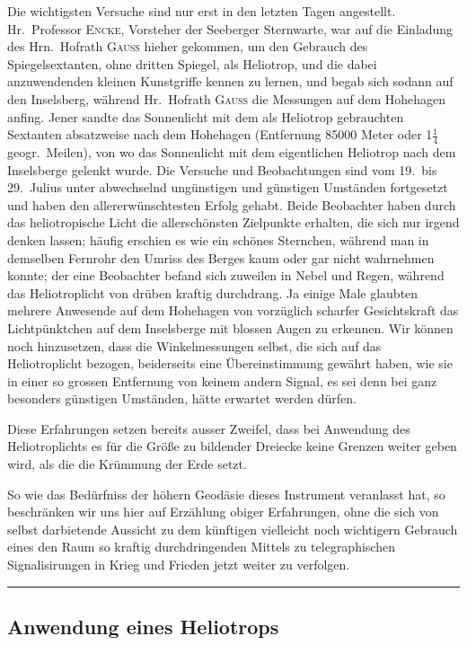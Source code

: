 \documentclass[12pt,a4paper]{article}
\theoremstyle{plain}
\theoremstyle{definition}
\theoremstyle{remark}
\begin{document}
Die wichtigsten Versuche sind nur erst in den letzten Tagen angestellt. Hr.\ Professor \textsc{Encke}, Vorsteher der Seeberger Sternwarte, war auf die Einladung des Hrn.\ Hofrath \textsc{Gau\ss{}} hieher gekommen, um den Gebrauch des Spiegelsextanten, ohne dritten Spiegel, als Heliotrop, und die dabei anzuwendenden kleinen Kunstgriffe kennen zu lernen, und begab sich sodann auf den Inselsberg, w\"ahrend Hr.\ Hofrath \textsc{Gau\ss{}} die Messungen auf dem Hohehagen anfing. Jener sandte das Sonnenlicht mit dem als Heliotrop gebrauchten Sextanten absatzweise nach dem Hohehagen (Entfernung 85000 Meter oder 1$\tfrac14$ geogr.\ Meilen), von wo das Sonnenlicht mit dem eigentlichen Heliotrop nach dem Inselsberge gelenkt wurde. Die Versuche und Beobachtungen sind vom 19.\ bis 29.\ Julius unter abwechselnd ung\"unstigen und g\"unstigen Umst\"anden fortgesetzt und haben den allererw\"unschtesten Erfolg gehabt. Beide Beobachter haben durch das heliotropische Licht die allersch\"onsten Zielpunkte erhalten, die sich nur irgend denken lassen; h\"aufig erschien es wie ein sch\"ones Sternchen, w\"ahrend man in demselben Fernrohr den Umriss des Berges kaum oder gar nicht wahrnehmen konnte; der eine Beobachter befand sich zuweilen in Nebel und Regen, w\"ahrend das Heliotroplicht von dr\"uben kraftig durchdrang. Ja einige Male glaubten mehrere Anwesende auf dem Hohehagen von vorz\"uglich scharfer Gesichtskraft das Lichtp\"unktchen auf dem Inselsberge mit blossen Augen zu erkennen. Wir k\"onnen noch hinzusetzen, dass die Winkelmessungen selbst, die sich auf das Heliotroplicht bezogen, beiderseits eine \"Ubereinstimmung gew\"ahrt haben, wie sie in einer so grossen Entfernung von keinem andern Signal, es sei denn bei ganz besonders g\"unstigen Umst\"anden, h\"atte erwartet werden d\"urfen.

Diese Erfahrungen setzen bereits ausser Zweifel, dass bei Anwendung des Heliotroplichts es f\"ur die Gr\"o\ss e zu bildender Dreiecke keine Grenzen weiter geben wird, als die die Kr\"ummung der Erde setzt.

So wie das Bed\"urfniss der h\"ohern Geod\"asie dieses Instrument veranlasst hat, so beschr\"anken wir uns hier auf Erz\"ahlung obiger Erfahrungen, ohne die sich von selbst darbietende Aussicht zu dem k\"unftigen vielleicht noch wichtigern Gebrauch eines den Raum so kraftig durchdringenden Mittels zu telegraphischen Signalisirungen in Krieg und Frieden jetzt weiter zu verfolgen.

\bigskip
\hrule
\bigskip

\subsection*{Anwendung eines Heliotrops}
\end{document}
